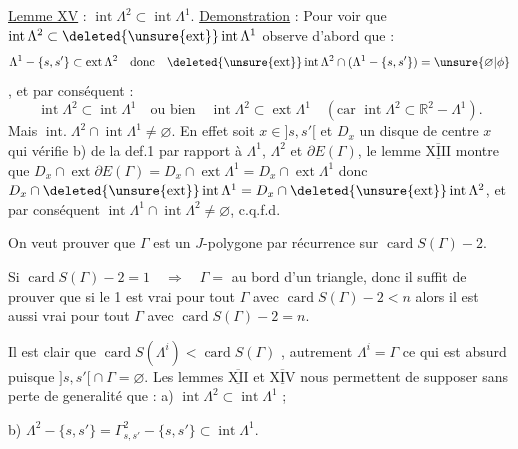 \uline{Lemme XV} : $\operatorname{int}\Lambda^2\subset\operatorname{int}\Lambda^1$.
\uline{Demonstration} : Pour voir que $\operatorname{int}\Lambda^2\subset\deleted{\unsure{\operatorname{ext}}}\operatorname{int}\Lambda^1$  observe d'abord que :
\[
\Lambda^1-\{s,s'\}\subset\operatorname{ext}\Lambda^2\quad\text{donc}\quad\deleted{\unsure{\operatorname{ext}}}\operatorname{int}\Lambda^2\cap(\Lambda^1-\{s,s'\})=\unsure{\varnothing|\phi}
\]
, et par conséquent :
\[
\operatorname{int}\Lambda^2\subset\operatorname{int}\Lambda^1\quad\text{ou bien}\quad\operatorname{int}\Lambda^2\subset\operatorname{ext}\Lambda^1\quad(\text{car }\operatorname{int}\Lambda^2\subset\mathbb R^2-\Lambda^1).
\]
Mais $\operatorname{int.}\Lambda^2\cap\operatorname{int}\Lambda^1\ne\varnothing$. En effet soit $x\in{]s,s'[}$ et $D_x$ un disque de centre $x$ qui vérifie b) de la def.1 par rapport à $\Lambda^1$, $\Lambda^2$ et $\partial E(\Gamma)$, le lemme $\underline{\overline{\mathrm{XIII}}}$ montre que $D_x\cap\operatorname{ext}\partial E(\Gamma)=D_x\cap\operatorname{ext}\Lambda^1=D_x\cap\operatorname{ext}\Lambda^1$ donc $D_x\cap\deleted{\unsure{\operatorname{ext}}}\operatorname{int}\Lambda^1=D_x\cap\deleted{\unsure{\operatorname{ext}}}\operatorname{int}\Lambda^2$, et par conséquent $\operatorname{int}\Lambda^1\cap\operatorname{int}\Lambda^2\ne\varnothing$, c.q.f.d.

On veut prouver que $\Gamma$ est un $J$-polygone par récurrence sur $\operatorname{card}S(\Gamma)-2$.

Si $\operatorname{card}S(\Gamma)-2=1\quad\Rightarrow\quad\Gamma={}$ au bord d'un triangle, donc il suffit de prouver que si le  1 est vrai pour tout $\Gamma$ avec $\operatorname{card}S(\Gamma)-2<n$ alors il est aussi vrai pour tout $\Gamma$ avec $\operatorname{card}S(\Gamma)-2=n$.

Il est clair que $\operatorname{card}S(\Lambda^i)<\operatorname{card}S(\Gamma)$ , autrement $\Lambda^i=\Gamma$ ce qui est absurd puisque $ {]s,s'[}\cap\Gamma=\varnothing$. Les lemmes $\underline{\overline{\mathrm{XII}}}$ et $\underline{\overline{\mathrm{XIV}}}$  nous permettent de supposer sans perte de generalité que : a) $\operatorname{int}\Lambda^2\subset\operatorname{int}\Lambda^1$ ;

b) $\Lambda^2-\{s,s'\}=\Gamma^2_{s,s'}-\{s,s'\}\subset\operatorname{int}\Lambda^1$.


